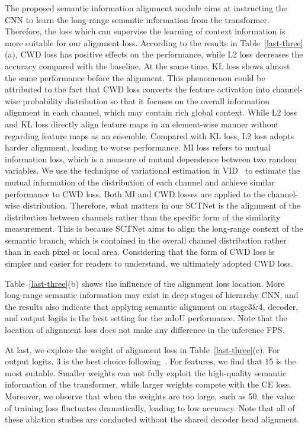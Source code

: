 \documentclass[letterpaper]{article} %
\begin{document}
The proposed semantic information alignment module aims at instructing the CNN to learn the long-range semantic information from the transformer. Therefore, the loss which can supervise the learning of context information is more suitable for our alignment loss. According to the results in Table~\ref{last-three}(a), CWD loss has positive effects on the performance, while L2 loss decreases the accuracy compared with the baseline. At the same time, KL loss shows almost the same performance before the alignment. This phenomenon could be attributed to the fact that CWD loss converts the feature activation into channel-wise probability distribution so that it focuses on the overall information alignment in each channel, which may contain rich global context. While L2 loss and KL loss directly align feature maps in an element-wise manner without regarding feature maps as an ensemble. Compared with KL loss, L2 loss adopts harder alignment, leading to worse performance. MI loss refers to mutual information loss, which is a measure of mutual dependence between two random variables. We use the technique of variational estimation in VID~\cite{ahn2019variational} to estimate the mutual information of the distribution of each channel and achieve similar performance to CWD loss. Both MI and CWD losses are applied to the channel-wise distribution. Therefore, what matters in our SCTNet is the alignment of the distribution between channels rather than the specific form of the similarity measurement. This is because SCTNet aims to align the long-range context of the semantic branch, which is contained in the overall channel distribution rather than in each pixel or local area. Considering that the form of CWD loss is simpler and easier for readers to understand, we ultimately adopted CWD loss. 

Table~\ref{last-three}(b) shows the influence of the alignment loss location. More long-range semantic information may exist in deep stages of hierarchy CNN, and the results also indicate that applying semantic alignment on stage3\&4, decoder, and output logits is the best setting for the mIoU performance. Note that the location of alignment loss does not make any difference in the inference FPS. 

At last, we explore the weight of alignment loss in Table~\ref{last-three}(c). For output logits, 3 is the best choice following~\cite{shu2021channel}. For features, we find that 15 is the most suitable. Smaller weights can not fully exploit the high-quality semantic information of the transformer, while larger weights compete with the CE loss. Moreover, we observe that when the weights are too large, such as 50, the value of training loss fluctuates dramatically, leading to low accuracy. Note that all of these ablation studies are conducted without the shared decoder head alignment.
\end{document}
